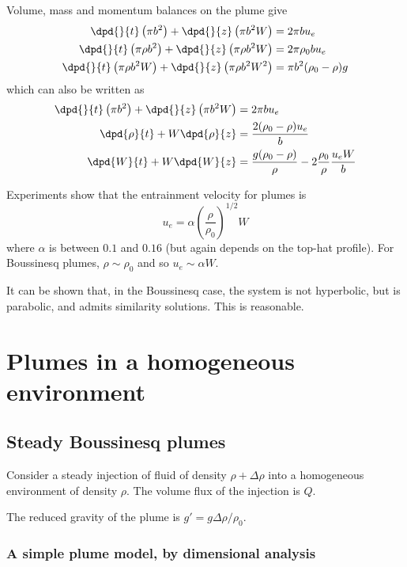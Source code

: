 Volume, mass and momentum balances on the plume give
\begin{align}
 \dpd{}{t} \left(\pi b^2\right) + \dpd{}{z} \left(\pi b^2 W\right) &= 2\pi b u_e \\
 \dpd{}{t} \left(\pi \rho b^2\right) + \dpd{}{z} \left(\pi \rho b^2 W\right) &= 2\pi \rho_0 b u_e \\
 \dpd{}{t} \left(\pi \rho b^2 W\right) + \dpd{}{z} \left(\pi \rho b^2 W^2\right) &= \pi b^2 (\rho_0 - \rho) g \\
\end{align}
which can also be written as 
\begin{align}
 \dpd{}{t} \left(\pi b^2\right) + \dpd{}{z} \left(\pi b^2 W\right) &= 2\pi b u_e \\
 \dpd{\rho}{t} + W\dpd{\rho}{z} &= \frac{2(\rho_0 - \rho) u_e}{b} \\
 \dpd{W}{t} + W\dpd{W}{z} &= \frac{g (\rho_0 - \rho)}{\rho} - 2\frac{\rho_0}{\rho} \frac{u_e W}{b}
\end{align}

Experiments show that the entrainment velocity for plumes is 
\begin{equation}
 u_e = \alpha \left(\frac{\rho}{\rho_0}\right)^{1/2} W
\end{equation}
where $\alpha$ is between $0.1$ and $0.16$ (but again depends on the top-hat
profile). For Boussinesq plumes, $\rho\sim\rho_0$ and so $u_e \sim \alpha W$. 

It can be shown that, in the Boussinesq case, the system is not hyperbolic, but
is parabolic, and admits similarity solutions. This is reasonable.

\section{Plumes in a homogeneous environment}

\subsection{Steady Boussinesq plumes}

Consider a steady injection of fluid of density $\rho+\Delta\rho$ into a
homogeneous environment of density $\rho$. The volume flux of the injection is
$Q$. 

The reduced gravity of the plume is $g' = g\Delta\rho/\rho_0$. 

\subsubsection{A simple plume model, by dimensional analysis}

